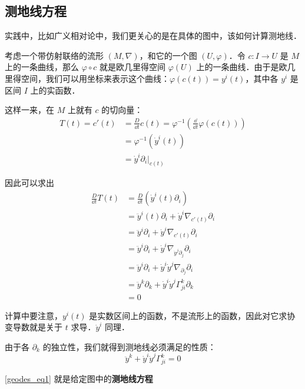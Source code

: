 \subsection{测地线方程}

实践中，比如广义相对论中，我们更关心的是在具体的图中，该如何计算测地线．

考虑一个带仿射联络的流形 $(M, \nabla)$，和它的一个图 $(U, \varphi)$．令 $c:I\to U$ 是 $M$ 上的一条曲线，那么 $\varphi\circ c$ 就是欧几里得空间 $\varphi(U)$ 上的一条曲线．由于是欧几里得空间，我们可以用坐标来表示这个曲线：$\varphi(c(t))=y^i(t)$，其中各 $y^i$ 是区间 $I$ 上的实函数．


这样一来，在 $M$ 上就有 $c$ 的切向量：
\begin{equation}
\begin{aligned}
T(t)=c'(t)&=\frac{D}{\dd t}c(t)=\varphi^{-1}(\frac{\dd}{\dd t}\varphi(c(t)))\\
&=\varphi^{-1}(\dot{y}^i(t))\\
&=\dot{y}^i\partial_i|_{c(t)}
\end{aligned}
\end{equation}

因此可以求出
\begin{equation}
\begin{aligned}
\frac{D}{\dd t}T(t)&=\frac{D}{\dd t}(\dot{y}^i(t)\partial_i)\\
&=\ddot{y}^i(t)\partial_i+\dot{y}^i\nabla_{c'(t)}\partial_i\\
&=\ddot{y}^i\partial_i+\dot{y}^i\nabla_{c'(t)}\partial_i\\
&=\ddot{y}^i\partial_i+\dot{y}^i\nabla_{\dot{y}^j\partial_j}\partial_i\\
&=\ddot{y}^i\partial_i+\dot{y}^i\dot{y}^j\nabla_{\partial_j}\partial_i\\
&=\ddot{y}^k\partial_k+\dot{y}^i\dot{y}^j\Gamma^k_{ji}\partial_k\\
&=0
\end{aligned}
\end{equation}

计算中要注意，$y^i(t)$ 是实数区间上的函数，不是流形上的函数，因此对它求协变导数就是关于 $t$ 求导．$\dot{y}^i$ 同理．

由于各 $\partial_k$ 的独立性，我们就得到测地线必须满足的性质：
\begin{equation}\label{geodes_eq1}
\ddot{y}^k+\dot{y}^i\dot{y}^j\Gamma^k_{ji}=0
\end{equation}

\autoref{geodes_eq1} 就是给定图中的\textbf{测地线方程}



